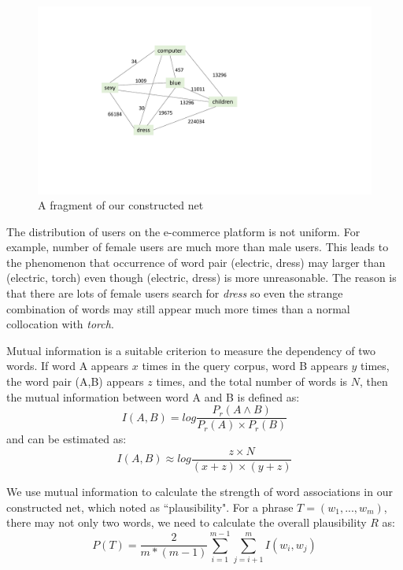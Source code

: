 \begin{figure}
	\centering
	\includegraphics[width=0.8\columnwidth]{images/associationNetColor.pdf}
	\caption{A fragment of our constructed net}
	\label{fig:net}
\end{figure}

The distribution of users on the e-commerce platform is not uniform. For example, number of female users are much more than male users. This leads to the phenomenon that occurrence of word pair (electric, dress) may larger than (electric, torch) even though (electric, dress) is more unreasonable. The reason is that there are lots of female users search for \textit{dress} so even the strange combination of words may still appear much more times than a normal collocation with \textit{torch}. 
 
Mutual information is a suitable criterion to measure the dependency of two words. If word A appears $x$ times in the query corpus, word B appears $y$ times, the word pair (A,B) appears $z$ times, and the total number of words is $N$, then the mutual information between word A and B is defined as:
\begin{equation}
I(A,B) = log\frac{P_r(A\wedge B)}{P_r(A)\times P_r(B)}
\end{equation}
and can be estimated as:%
\begin{equation}
I(A,B) \approx log\frac{z\times N}{(x+z)\times (y+z)}
\end{equation}

We use mutual information to calculate the strength of word associations in our constructed net, which noted as ``plausibility".
For a phrase $T=(w_1, ..., w_m)$, there may not only two words, we need to calculate the overall plausibility $R$ as:
\begin{equation}
P(T) = \frac{2}{m*(m-1)}\sum_{i=1}^{m-1}\sum_{j=i+1}^{m}I(w_i, w_j)
\end{equation}

